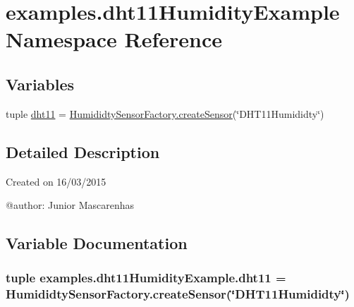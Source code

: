 \hypertarget{namespaceexamples_1_1dht11HumidityExample}{}\section{examples.\+dht11\+Humidity\+Example Namespace Reference}
\label{namespaceexamples_1_1dht11HumidityExample}
\subsection*{Variables}
\begin{DoxyCompactItemize}
\item 
tuple \hyperlink{namespaceexamples_1_1dht11HumidityExample_af2190e789e236b21aeae169631c50d0d}{dht11} = \hyperlink{classconcretefactory_1_1humiditySensorFactory_1_1HumididtySensorFactory_a591e773357247fd00a760fa160d7b231}{Humididty\+Sensor\+Factory.\+create\+Sensor}(\char`\"{}D\+H\+T11\+Humididty\char`\"{})
\end{DoxyCompactItemize}


\subsection{Detailed Description}
\begin{DoxyVerb}Created on 16/03/2015

@author: Junior Mascarenhas
\end{DoxyVerb}
 

\subsection{Variable Documentation}
\hypertarget{namespaceexamples_1_1dht11HumidityExample_af2190e789e236b21aeae169631c50d0d}{}
\subsubsection[{dht11}]{\setlength{\rightskip}{0pt plus 5cm}tuple examples.\+dht11\+Humidity\+Example.\+dht11 = {\bf Humididty\+Sensor\+Factory.\+create\+Sensor}(\char`\"{}D\+H\+T11\+Humididty\char`\"{})}\label{namespaceexamples_1_1dht11HumidityExample_af2190e789e236b21aeae169631c50d0d}
